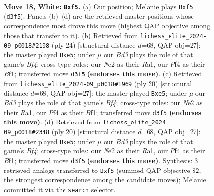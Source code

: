 \documentclass[11pt]{article}
\begin{document}
\clearpage

\begin{figure}[p]\centering
\begin{subfigure}{0.46\textwidth}\centering
\resizebox{\linewidth}{!}{%
\newchessgame
\chessboard[
  setfen={rnb1k2r/pp2b1pp/4pp2/3pPn2/5P1P/3B2P1/P2NN3/R1B1K2R w KQ - 0 18},
  showmover=false,
  pgfstyle=straightmove, color=movearrow, markmove={d3-f5}
]}
\caption{}
\end{subfigure}\hfill
\begin{subfigure}{0.46\textwidth}\centering
\resizebox{\linewidth}{!}{%
\newchessgame
\chessboard[
  setfen={r1b1k2r/ppp2ppp/3b1n2/3Pn3/5B2/1NNp4/PPP2PPP/R3KB1R w KQkq - 2 13},
  showmover=false,
  pgfstyle=straightmove, color=movearrow, markmove={f4-e5}
]}
\caption{}
\end{subfigure}
\\[4pt]
\begin{subfigure}{0.46\textwidth}\centering
\resizebox{\linewidth}{!}{%
\newchessgame
\chessboard[
  setfen={r1b1k2r/ppp2ppp/3b1n2/3Pn3/5B2/1NNp4/PPP2PPP/R3KB1R w KQkq - 2 11},
  showmover=false,
  pgfstyle=straightmove, color=movearrow, markmove={f4-e5}
]}
\caption{}
\end{subfigure}\hfill
\begin{subfigure}{0.46\textwidth}\centering
\resizebox{\linewidth}{!}{%
\newchessgame
\chessboard[
  setfen={r1b1k2r/ppp2ppp/3b1n2/3Pn3/5B2/1NNp4/PPP2PPP/R3KB1R w KQkq - 2 11},
  showmover=false,
  pgfstyle=straightmove, color=movearrow, markmove={f4-e5}
]}
\caption{}
\end{subfigure}
\caption{\textbf{Move 18, White: \texttt{Bxf5}.} (a) Our position; Melanie plays \texttt{Bxf5} (\texttt{d3f5}). Panels (b)--(d) are the retrieved master positions whose correspondence most drove this move (highest QAP objective among those that transfer to it). (b) Retrieved from \texttt{lichess\_elite\_2024-09\_p0018\#2108} (ply 24) [structural distance $d$=68, QAP obj=27]: the master played \texttt{Bxe5}; under $\mu$ our \emph{Bd3} plays the role of that game's \emph{Bf4}; cross-type roles: our \emph{N}e2 as their \emph{R}a1, our \emph{P}f4 as their \emph{B}f1; transferred move \texttt{d3f5} \textbf{(endorses this move)}. (c) Retrieved from \texttt{lichess\_elite\_2024-09\_p0018\#1969} (ply 20) [structural distance $d$=68, QAP obj=27]: the master played \texttt{Bxe5}; under $\mu$ our \emph{Bd3} plays the role of that game's \emph{Bf4}; cross-type roles: our \emph{N}e2 as their \emph{R}a1, our \emph{P}f4 as their \emph{B}f1; transferred move \texttt{d3f5} \textbf{(endorses this move)}. (d) Retrieved from \texttt{lichess\_elite\_2024-09\_p0018\#2348} (ply 20) [structural distance $d$=68, QAP obj=27]: the master played \texttt{Bxe5}; under $\mu$ our \emph{Bd3} plays the role of that game's \emph{Bf4}; cross-type roles: our \emph{N}e2 as their \emph{R}a1, our \emph{P}f4 as their \emph{B}f1; transferred move \texttt{d3f5} \textbf{(endorses this move)}. Synthesis: 3 retrieved analogs transferred to \texttt{Bxf5} (summed QAP objective 82, the strongest correspondence among the candidate moves); Melanie committed it via the \texttt{search} selector.}
\label{fig:thought-m34}
\end{figure}
\end{document}
